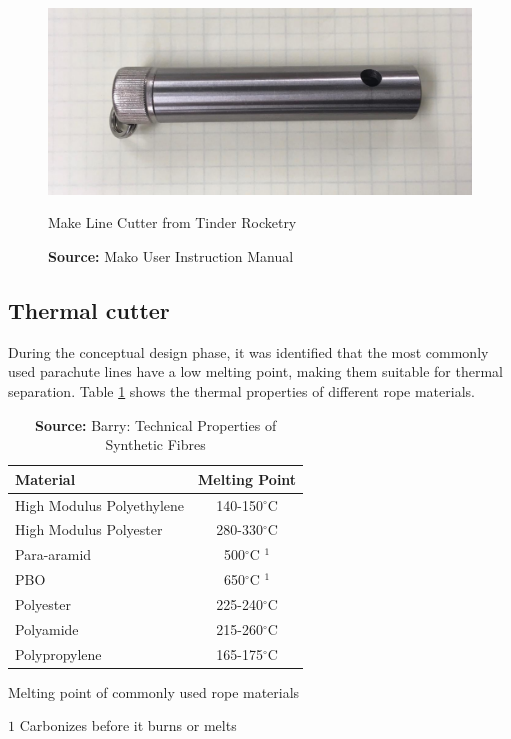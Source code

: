 \begin{figure}[h!]
	\centering
	\includegraphics[width=13cm]{images/tinder-rocketry}
	\caption{Make Line Cutter from Tinder Rocketry}
	\caption*{\textbf{Source:} Mako User Instruction Manual  \cite{mako-user-instuction}}
	\label{fig:mako-cutter}
\end{figure}

\newpage


\subsection{Thermal cutter}
During the conceptual design phase, it was identified that the most commonly used parachute lines have a low melting point, making them suitable for thermal separation. Table \ref{tab:thermal-properties} shows the thermal properties of different rope materials.

\begin{table}[h]
    \centering
    \begin{tabular}{ | l | c |}
      \hline
      \textbf{Material}             & \textbf{Melting Point}    \\ \hline
      High Modulus Polyethylene     & 140-150$^\circ$C          \\ \hline
      High Modulus Polyester        & 280-330$^\circ$C          \\ \hline
      Para-aramid                   & 500$^\circ$C $^1$         \\ \hline
      PBO                           & 650$^\circ$C $^1$         \\ \hline
      Polyester                     & 225-240$^\circ$C          \\ \hline
      Polyamide                     & 215-260$^\circ$C          \\ \hline
      Polypropylene                 & 165-175$^\circ$C          \\ \hline
    \end{tabular}
    \caption{\label{tab:thermal-properties}Melting point of commonly used rope materials}
    \caption*{\textbf{Source:} Barry: Technical Properties of Synthetic Fibres \cite{fibers}}
\end{table}
\begin{footnotesize}
        {$1$ Carbonizes before it burns or melts}
\end{footnotesize}

